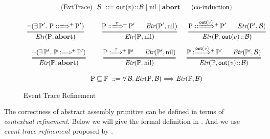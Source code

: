 \begin{figure*}[!t]
    \centering
    \[
        \begin{array}{c}
            \TYPE{(EvtTrace)} \ \ \evttr \ \define \ 
            \outEvt{\val} \stCons \evttr \sepline \nil \sepline 
            \evtabort \quad \ \ \TYPE{(co-induction)} \\
            \\
            \infer=
            {
                \Etr{(\prog, \evtabort)}
            }
            {
                \neg
                (\exists \, \prog'. \ 
                 \LGlobMultiTrans{\prog}{}{+}{\prog'})
            } \qquad \ \ 
            \infer= 
            {
                \Etr{(\prog, \nil)}
            }
            {
                \LGlobMultiTrans{\prog}{ \, \empmsg \ }{+}{\prog'} 
                \quad \ \ 
                \Etr{(\prog', \nil)}
            } \quad \ \ 
            \infer=
            {
                \Etr{(\prog, \outEvt{\val} \stCons \evttr)}
            }
            {
                \LGlobMultiTrans{\prog}{\!\!\outEvt{\val}\!}{+}{\prog'}
                \quad \ \ 
                \Etr{(\prog', \evttr)}
            } \\
            \\[-5pt]
            \infer=
            {
                \Etr{(\HProg, \evtabort)}
            }
            {
                \neg
                (\exists \, \HProg'. \ 
                 \HGlobMultiTrans{\HProg}{}{+}{\HProg'})
            } \qquad \ \ 
            \infer= 
            {
                \Etr{(\HProg, \nil)}
            }
            {
                \HGlobMultiTrans{\HProg}{ \, \empmsg \ }{+}{\HProg'} 
                \quad \ \ 
                \Etr{(\HProg', \nil)}
            } \quad \ \ 
            \infer=
            {
                \Etr{(\HProg, \outEvt{\val} \stCons \evttr)}
            }
            {
                \HGlobMultiTrans{\HProg}{\!\!\outEvt{\val}\!}{+}{\HProg'}
                \quad \ \ 
                \Etr{(\HProg', \evttr)}
            } \\
            \\
            \prog \refine \HProg \ \define \ 
                \forall \, \evttr. \, 
                \Etr{(\prog, \evttr)} \Longrightarrow
                \Etr{(\HProg, \evttr)}  
        \end{array}
    \]
    \caption{Event Trace Refinement}
    \label{fig:event-trace-refinement}
\end{figure*}

The correctness of abstract assembly primitive can be defined in terms of  
{\it contextual refinement}.  
Below we will give the formal definition in 
\Def{\ref{def:prim-correctness}}.  
And we use {\it event trace refinement} 
proposed by \etal{Liang} \cite{liang14lics}.

